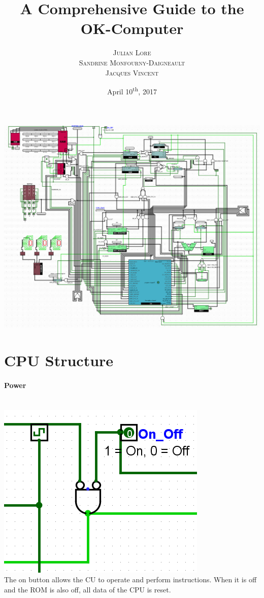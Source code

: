 \documentclass{article}
\title{A Comprehensive Guide to the OK-Computer}
\date{April 10\textsuperscript{th}, 2017}
\author{
	\textsc{Julian Lore}\\
	\textsc{Sandrine Monfourny-Daigneault}\\
	\textsc{Jacques Vincent}\\
}
\begin{document}
	\maketitle
	\begin{center}
\includegraphics[scale=0.4]{CPU}
\end{center}
	\tableofcontents
	\newpage
	\pagestyle{myheadings}
	\section{CPU Structure}
	\paragraph{Power}~
	\\ \includegraphics[scale=0.5]{ON}\\The on button allows the CU to operate and perform instructions. When it is off and the ROM is also off, all data of the CPU is reset.
\end{document}
